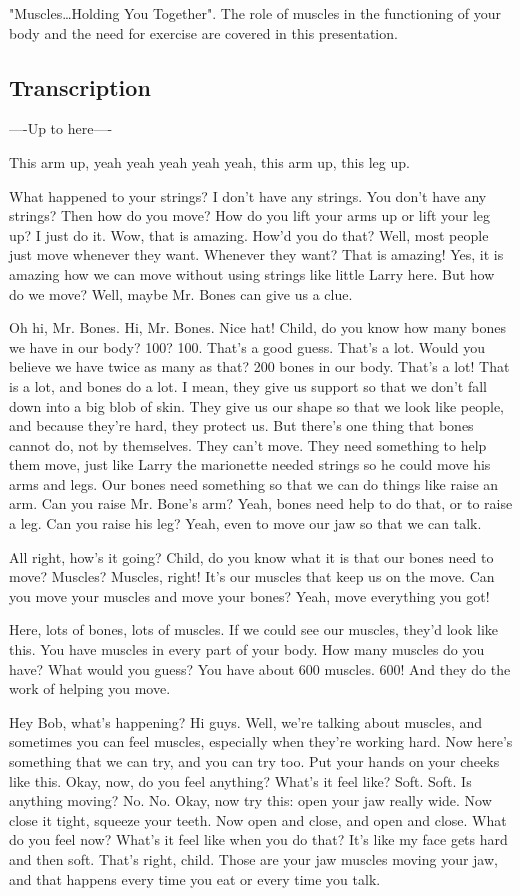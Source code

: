 "Muscles\dots Holding You Together". The role of muscles in the functioning of your body and the need for exercise are covered in this presentation.

\subsection{Transcription}

----Up to here----

This arm up, yeah yeah yeah yeah yeah, this arm up, this leg up.

What happened to your strings?
I don't have any strings.
You don't have any strings? Then how do you move? How do you lift your arms up or lift your leg up?
I just do it.
Wow, that is amazing. How'd you do that?
Well, most people just move whenever they want.
Whenever they want? That is amazing!
Yes, it is amazing how we can move without using strings like little Larry here. But how do we move? Well, maybe Mr. Bones can give us a clue.

Oh hi, Mr. Bones.
Hi, Mr. Bones. Nice hat!
Child, do you know how many bones we have in our body?
100?
100. That's a good guess. That's a lot. Would you believe we have twice as many as that? 200 bones in our body.
That's a lot!
That is a lot, and bones do a lot. I mean, they give us support so that we don't fall down into a big blob of skin. They give us our shape so that we look like people, and because they're hard, they protect us. But there's one thing that bones cannot do, not by themselves. They can't move. They need something to help them move, just like Larry the marionette needed strings so he could move his arms and legs. Our bones need something so that we can do things like raise an arm. Can you raise Mr. Bone's arm? Yeah, bones need help to do that, or to raise a leg. Can you raise his leg? Yeah, even to move our jaw so that we can talk.

All right, how's it going? Child, do you know what it is that our bones need to move?
Muscles?
Muscles, right! It's our muscles that keep us on the move. Can you move your muscles and move your bones? Yeah, move everything you got!

Here, lots of bones, lots of muscles. If we could see our muscles, they'd look like this. You have muscles in every part of your body. How many muscles do you have? What would you guess? You have about 600 muscles. 600! And they do the work of helping you move.

Hey Bob, what's happening?
Hi guys. Well, we're talking about muscles, and sometimes you can feel muscles, especially when they're working hard. Now here's something that we can try, and you can try too. Put your hands on your cheeks like this. Okay, now, do you feel anything? What's it feel like?
Soft.
Soft. Is anything moving?
No.
No. Okay, now try this: open your jaw really wide. Now close it tight, squeeze your teeth. Now open and close, and open and close. What do you feel now? What's it feel like when you do that?
It's like my face gets hard and then soft.
That's right, child. Those are your jaw muscles moving your jaw, and that happens every time you eat or every time you talk.

